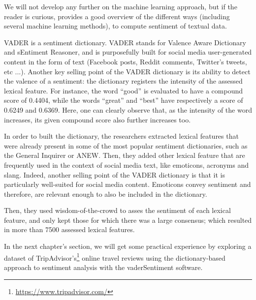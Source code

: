 	We will not develop any further on the machine learning approach, but if the reader is curious, \cite{xiang_sentiment_2013} provides a good overview of the different ways (including several machine learning methods), to compute sentiment of textual data.

	VADER is a sentiment dictionary. VADER stands for Valence Aware Dictionary and sEntiment Reasoner, and is purposefully built for social media user-generated content in the form of text (Facebook posts, Reddit comments, Twitter's tweets, etc ...). Another key selling point of the VADER dictionary is its ability to detect the valence of a sentiment: the dictionary registers the intensity of the assessed lexical feature. For instance, the word ``good'' is evaluated to have a compound score of 0.4404, while the words ``great'' and ``best'' have respectively a score of 0.6249 and 0.6369. Here, one can clearly observe that, as the intensity of the word increases, its given compound score also further increases too.

	In order to built the dictionary, the researchers extracted lexical features that were already present in some of the most popular sentiment dictionaries, such as the General Inquirer or ANEW. Then, they added other lexical feature that are frequently used in the context of social media text, like emoticons, acronyms and slang. Indeed, another selling point of the VADER dictionary is that it is particularly well-suited for social media content. Emoticons convey sentiment and therefore, are relevant enough to also be included in the dictionary.

	Then, they used wisdom-of-the-crowd to asses the sentiment of each lexical feature, and only kept those for which there was a large consensus; which resulted in more than 7500 assessed lexical features.

	In the next chapter's section, we will get some practical experience by exploring a dataset of TripAdvisor's\footnote{\href{https://www.tripadvisor.com/}{https://www.tripadvisor.com/}} online travel reviews using the dictionary-based approach to sentiment analysis with the vaderSentiment software.
